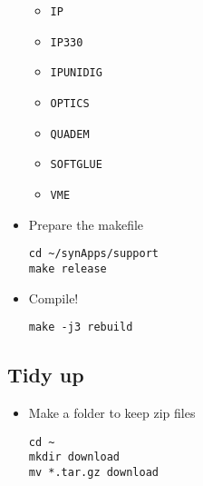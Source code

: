 \documentclass[11pt]{article}
\begin{document}
\begin{itemize}
\begin{itemize}
\item \verb~IP~
\item \verb~IP330~
\item \verb~IPUNIDIG~
\item \verb~OPTICS~
\item \verb~QUADEM~
\item \verb~SOFTGLUE~
\item \verb~VME~
\end{itemize}
\item Prepare the makefile
\begin{verbatim}
cd ~/synApps/support
make release
\end{verbatim}
\item Compile!
\begin{verbatim}
make -j3 rebuild
\end{verbatim}
\end{itemize}
\subsection{Tidy up}
\label{sec-1-3}
\begin{itemize}
\item Make a folder to keep zip files
\begin{verbatim}
cd ~
mkdir download
mv *.tar.gz download
\end{verbatim}
\end{itemize}
\end{document}

